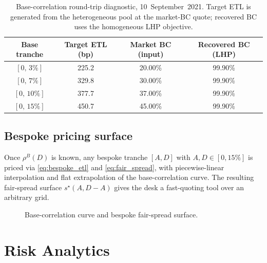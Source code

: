 \documentclass[11pt,a4paper]{article}
\newcommand{\1}{\mathbf{1}}
\begin{document}
\begin{table}[H]
\centering
\caption{Base-correlation round-trip diagnostic,
10~September~2021. Target ETL is generated from the heterogeneous
pool at the market-BC quote; recovered BC uses the homogeneous LHP
objective.}
\label{tab:bc_roundtrip}
\begin{tabular}{c c c c}
\toprule
\textbf{Base tranche} & \textbf{Target ETL (bp)}
& \textbf{Market BC (input)} & \textbf{Recovered BC (LHP)}\\
\midrule
\([0,\,3\%]\)  & 225.2 & 20.00\% & 99.90\%\\
\([0,\,7\%]\)  & 329.8 & 30.00\% & 99.90\%\\
\([0,\,10\%]\) & 377.7 & 37.00\% & 99.90\%\\
\([0,\,15\%]\) & 450.7 & 45.00\% & 99.90\%\\
\bottomrule
\end{tabular}
\end{table}

\subsection{Bespoke pricing surface}
Once \(\rho^{B}(D)\) is known, any bespoke tranche \([A,D]\) with
\(A,D\in[0,15\%]\) is priced via \eqref{eq:bespoke_etl} and
\eqref{eq:fair_spread}, with piecewise-linear interpolation and flat
extrapolation of the base-correlation curve. The resulting
fair-spread surface \(s^{\star}(A,D-A)\) gives the desk a
fast-quoting tool over an arbitrary grid.

\begin{figure}[H]
    \centering
    \caption{Base-correlation curve and bespoke fair-spread surface.}
    \label{fig:bc_surface}
\end{figure}

\section{Risk Analytics}\label{sec:risk}
\end{document}
